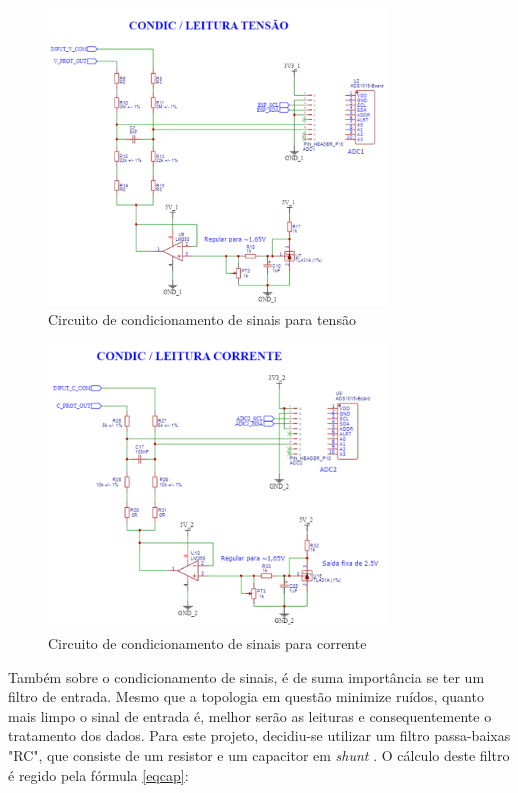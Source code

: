 \begin{figure}[htb!]
    \caption{Circuito de condicionamento de sinais para tensão}
    \label{fig:circ-cond-t}
    \includegraphics[width=0.8\textwidth]{figuras/circ-cond-t.png}
    \fonte{}
\end{figure}

\begin{figure}[htb!]
    \caption{Circuito de condicionamento de sinais para corrente}
    \label{fig:circ-cond-c}
    \includegraphics[width=0.8\textwidth]{figuras/circ-cond-c.png}
    \fonte{}
\end{figure}

Também sobre o condicionamento de sinais, é de suma importância se ter um filtro de entrada. Mesmo que a topologia em questão minimize ruídos, quanto mais limpo o sinal de entrada é, melhor serão as leituras e consequentemente o tratamento dos dados. Para este projeto, decidiu-se utilizar um filtro passa-baixas "RC", que consiste de um resistor e um capacitor em \textit{shunt} \cite{filtros}. O cálculo deste filtro é regido pela fórmula \autoref{eqcap}:

